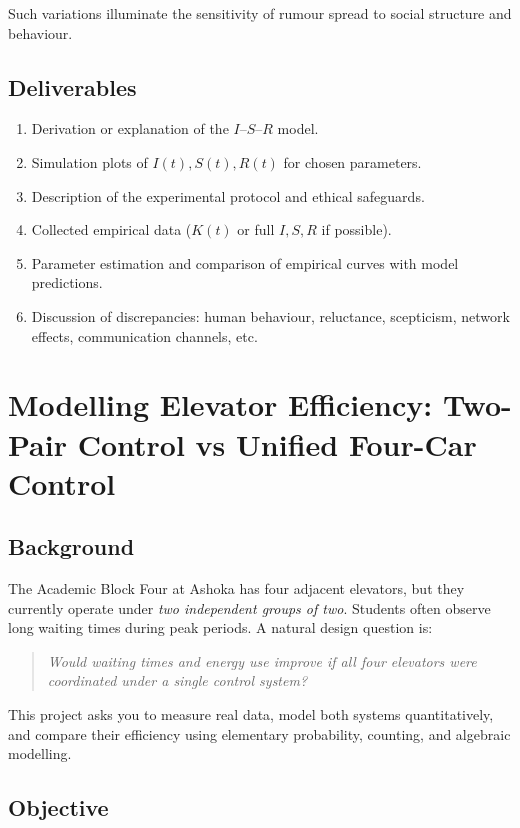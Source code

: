 \documentclass[11pt]{article}
\begin{document}
Such variations illuminate the sensitivity of rumour spread to social
structure and behaviour.

\subsection*{Deliverables}

\begin{enumerate}
    \item Derivation or explanation of the $I$--$S$--$R$ model.
    \item Simulation plots of $I(t),S(t),R(t)$ for chosen parameters.
    \item Description of the experimental protocol and ethical safeguards.
    \item Collected empirical data ($K(t)$ or full $I,S,R$ if possible).
    \item Parameter estimation and comparison of empirical curves with model predictions.
    \item Discussion of discrepancies: human behaviour, reluctance,
    scepticism, network effects, communication channels, etc.
\end{enumerate}


\section{Modelling Elevator Efficiency: Two-Pair Control vs Unified Four-Car Control}
\subsection{Background}

The Academic Block Four at Ashoka has four adjacent elevators, but they currently operate
under \emph{two independent groups of two}. Students often observe long
waiting times during peak periods. A natural design question is:

\begin{quote}
\textit{Would waiting times and energy use improve if all four elevators were 
coordinated under a single control system?}
\end{quote}

This project asks you to measure real data, model both systems quantitatively,
and compare their efficiency using elementary probability, counting, and
algebraic modelling.

\subsection{Objective}
\end{document}

